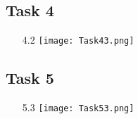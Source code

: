 \documentclass{article}
\begin{document}
\subsection*{Task 4}
\begin{itemize}
    \item[4.2]\texttt{[image: Task43.png]} 
\end{itemize}


\subsection*{Task 5}
\begin{itemize}
    \item[5.3]\texttt{[image: Task53.png]} 
\end{itemize}
\end{document}
